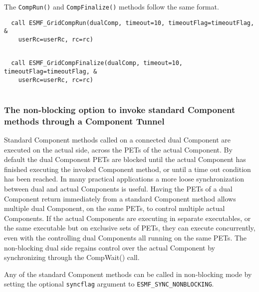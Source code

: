    The {\tt CompRun()} and {\tt CompFinalize()} methods follow the same format.
   

 \begin{verbatim}
  call ESMF_GridCompRun(dualComp, timeout=10, timeoutFlag=timeoutFlag, &
    userRc=userRc, rc=rc)
 
\end{verbatim}
 

 \begin{verbatim}
  call ESMF_GridCompFinalize(dualComp, timeout=10, timeoutFlag=timeoutFlag, &
    userRc=userRc, rc=rc)
 
\end{verbatim}
 

  \subsubsection{The non-blocking option to invoke standard Component methods through a Component Tunnel}
   
   \label{sec:CompTunnelInvokingNonblocking}
  
   Standard Component methods called on a connected dual Component are executed
   on the actual side, across the PETs of the actual Component. By default the
   dual Component PETs are blocked until the actual Component has finished
   executing the invoked Component method, or until a time out condition has been
   reached. In many practical applications a more loose synchronization between
   dual and actual Components is useful. Having the PETs of a dual
   Component return immediately from a standard Component method allows multiple
   dual Component, on the same PETs, to control multiple actual Components. 
   If the actual Components are executing in separate executables, or the same 
   executable but on exclusive sets of PETs, they can execute concurrently, even
   with the controlling dual Components all running on the same PETs.
   The non-blocking dual side regains control over the actual Component by 
   synchronizing through the CompWait() call.
  
   Any of the standard Component methods can be called in non-blocking mode
   by setting the optional {\tt syncflag} argument to 
   {\tt ESMF\_SYNC\_NONBLOCKING}.  

